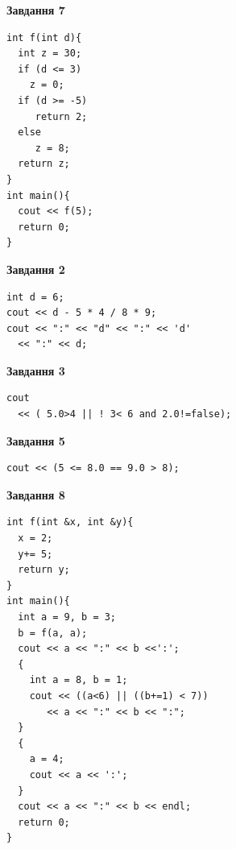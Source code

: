 \documentclass[12pt, ukrainian]{article}
\begin{document}
{\begin {large}
\begin{minipage}[t]{7.0cm}
\begin{center}
\textbf{Завдання 7}
\end{center}
\vspace{-8mm}

\begin{verbatim}
int f(int d){
  int z = 30;
  if (d <= 3)
    z = 0;
  if (d >= -5)
     return 2;
  else
     z = 8;
  return z;
}
int main(){
  cout << f(5);
  return 0;
}
\end{verbatim}

\end{minipage}
\vline \hspace{1mm}
\begin{minipage}[t]{11.0cm}

\begin{center}
\textbf{Завдання 2}
\end{center}
\vspace{-8mm}

\begin{verbatim}
int d = 6;
cout << d - 5 * 4 / 8 * 9;
cout << ":" << "d" << ":" << 'd' 
  << ":" << d;
\end{verbatim}



\begin{center}
\textbf{Завдання 3}
\end{center}
\vspace{-8mm}

\begin{verbatim}
cout 
  << ( 5.0>4 || ! 3< 6 and 2.0!=false);
\end{verbatim}



\begin{center}
\textbf{Завдання 5}
\end{center}
\vspace{-8mm}

\begin{verbatim}
cout << (5 <= 8.0 == 9.0 > 8);
\end{verbatim}



\begin{center}
\textbf{Завдання 8}
\end{center}
\vspace{-8mm}

\begin{verbatim}
int f(int &x, int &y){
  x = 2;
  y+= 5;
  return y;
}
int main(){
  int a = 9, b = 3;
  b = f(a, a);
  cout << a << ":" << b <<':';
  {
    int a = 8, b = 1;
    cout << ((a<6) || ((b+=1) < 7))
       << a << ":" << b << ":";
  }
  {
    a = 4;
    cout << a << ':';
  }
  cout << a << ":" << b << endl;
  return 0;
}
\end{verbatim}


\end{minipage}
\end{large}}
\end{document}
